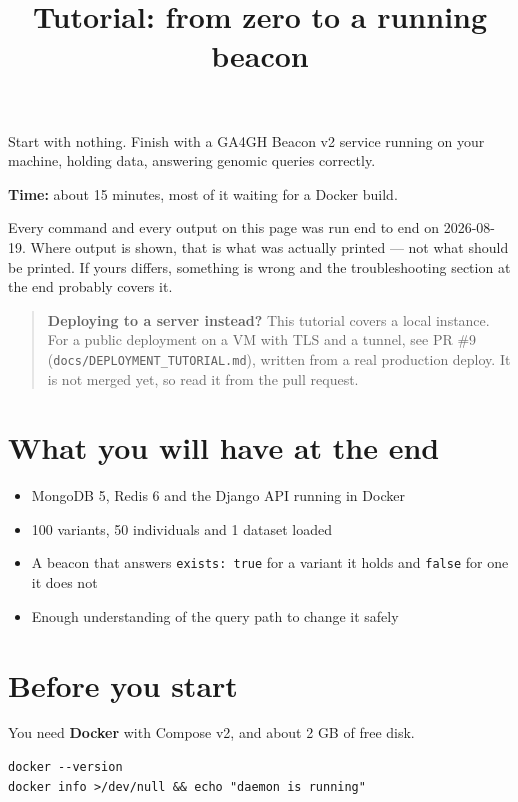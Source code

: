 \documentclass[
  10pt,
]{article}
\title{Tutorial: from zero to a running beacon}
\author{}
\date{}
\providecommand{\tightlist}{%
  \setlength{\itemsep}{0pt}\setlength{\parskip}{0pt}}
\begin{document}
\maketitle

{
\setcounter{tocdepth}{3}
\tableofcontents
}
Start with nothing. Finish with a GA4GH Beacon v2 service running on
your machine, holding data, answering genomic queries correctly.

\textbf{Time:} about 15 minutes, most of it waiting for a Docker build.

Every command and every output on this page was run end to end on
2026-08-19. Where output is shown, that is what was actually printed ---
not what should be printed. If yours differs, something is wrong and the
troubleshooting section at the end probably covers it.

\begin{quote}
\textbf{Deploying to a server instead?} This tutorial covers a local
instance. For a public deployment on a VM with TLS and a tunnel, see PR
\#9 (\texttt{docs/DEPLOYMENT\_TUTORIAL.md}), written from a real
production deploy. It is not merged yet, so read it from the pull
request.
\end{quote}

\section{What you will have at the
end}\label{what-you-will-have-at-the-end}

\begin{itemize}
\tightlist
\item
  MongoDB 5, Redis 6 and the Django API running in Docker
\item
  100 variants, 50 individuals and 1 dataset loaded
\item
  A beacon that answers \texttt{exists:\ true} for a variant it holds
  and \texttt{false} for one it does not
\item
  Enough understanding of the query path to change it safely
\end{itemize}

\section{Before you start}\label{before-you-start}

You need \textbf{Docker} with Compose v2, and about 2 GB of free disk.

\begin{verbatim}
docker --version
docker info >/dev/null && echo "daemon is running"
\end{verbatim}
\end{document}
